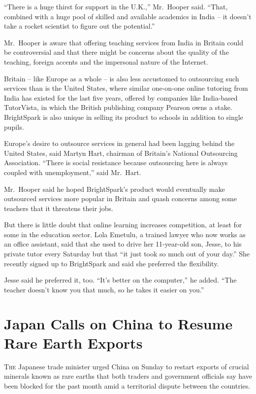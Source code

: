 ﻿\documentclass[12pt]{article}
\begin{document}
``There is a huge thirst for support in the U.K.,'' Mr.~Hooper said. ``That, combined with a huge
pool of skilled and available academics in India -- it doesn't take a rocket scientist to figure out
the potential.''

Mr.~Hooper is aware that offering teaching services from India in Britain could be controversial and
that there might be concerns about the quality of the teaching, foreign accents and the impersonal
nature of the Internet.

Britain -- like Europe as a whole -- is also less accustomed to outsourcing such services than is
the United States, where similar one-on-one online tutoring from India has existed for the last five
years, offered by companies like India-based TutorVista, in which the British publishing company
Pearson owns a stake. BrightSpark is also unique in selling its product to schools in addition to
single pupils.

Europe's desire to outsource services in general had been lagging behind the United States, said
Martyn Hart, chairman of Britain's National Outsourcing Association. ``There is social resistance
because outsourcing here is always coupled with unemployment,'' said Mr.~Hart.

Mr.~Hooper said he hoped BrightSpark's product would eventually make outsourced services more
popular in Britain and quash concerns among some teachers that it threatens their jobs.

But there is little doubt that online learning increases competition, at least for some in the
education sector. Lola Emetulu, a trained lawyer who now works as an office assistant, said that she
used to drive her 11-year-old son, Jesse, to his private tutor every Saturday but that ``it just
took so much out of your day.'' She recently signed up to BrightSpark and said she preferred the
flexibility.

Jesse said he preferred it, too. ``It’s better on the computer,'' he added. ``The teacher doesn't
know you that much, so he takes it easier on you.''

\section{Japan Calls on China to Resume Rare Earth Exports}

\lettrine{T}{he} Japanese trade minister urged China on Sunday to restart
exports of crucial minerals known as rare earths that both traders and government officials say have
been blocked for the past month amid a territorial dispute between the countries.
\end{document}
